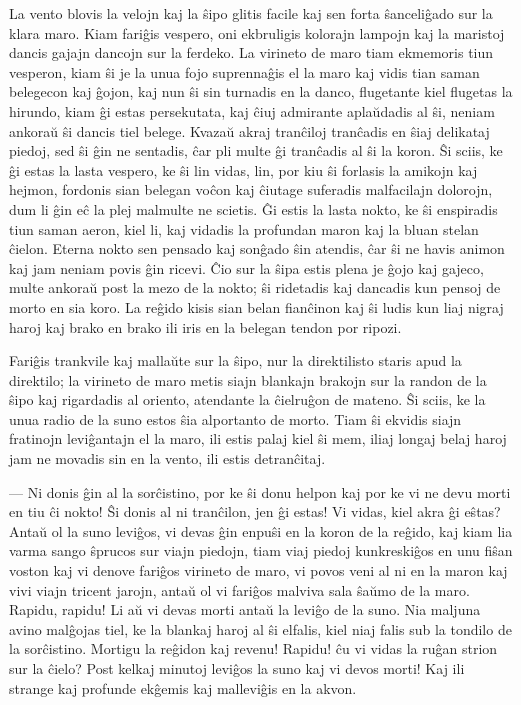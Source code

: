    La vento blovis la velojn kaj la \^sipo glitis facile kaj sen forta
\^sanceli\^gado sur la klara maro. Kiam fari\^gis vespero, oni
ekbruligis kolorajn lampojn kaj la maristoj dancis gajajn dancojn
sur la ferdeko. La virineto de maro tiam ekmemoris tiun vesperon,
kiam \^si je la unua fojo suprenna\^gis el la maro kaj vidis tian
saman belegecon kaj \^gojon, kaj nun \^si sin turnadis en la danco,
flugetante kiel flugetas la hirundo, kiam \^gi estas persekutata,
kaj \^ciuj admirante apla\u udadis al \^si, neniam ankora\u u \^si
dancis tiel belege. Kvaza\u u akraj tran\^ciloj tran\^cadis en
\^siaj delikataj piedoj, sed \^si \^gin ne sentadis, \^car pli multe
\^gi tran\^cadis al \^si la koron. \^Si sciis, ke \^gi estas la
lasta vespero, ke \^si lin vidas, lin, por kiu \^si forlasis la
amikojn kaj hejmon, fordonis sian belegan vo\^con kaj \^ciutage
suferadis malfacilajn dolorojn, dum li \^gin e\^c la plej malmulte
ne scietis. \^Gi estis la lasta nokto, ke \^si enspiradis tiun saman
aeron, kiel li, kaj vidadis la profundan maron kaj la bluan stelan
\^cielon. Eterna nokto sen pensado kaj son\^gado \^sin atendis,
\^car \^si ne havis animon kaj jam neniam povis \^gin ricevi. \^Cio
sur la \^sipa estis plena je \^gojo kaj gajeco, multe ankora\u u
post la mezo de la nokto; \^si ridetadis kaj dancadis kun pensoj de
morto en sia koro. La re\^gido kisis sian belan fian\^cinon kaj \^si
ludis kun liaj nigraj haroj kaj brako en brako ili iris en la
belegan tendon por ripozi.

   Fari\^gis trankvile kaj malla\u ute sur la \^sipo, nur la direktilisto
staris apud la direktilo; la virineto de maro metis siajn blankajn
brakojn sur la randon de la \^sipo kaj rigardadis al oriento,
atendante la \^cielru\^gon de mateno. \^Si sciis, ke la unua radio
de la suno estos \^sia alportanto de morto. Tiam \^si ekvidis siajn
fratinojn levi\^gantajn el la maro, ili estis palaj kiel \^si mem,
iliaj longaj belaj haroj jam ne movadis sin en la vento, ili estis
detran\^citaj.

 --- Ni donis \^gin al la sor\^cistino, por ke \^si donu helpon kaj por ke
vi ne devu morti en tiu \^ci nokto! \^Si donis al ni tran\^cilon,
jen \^gi estas! Vi vidas, kiel akra \^gi e\^stas? Anta\u u ol la
suno levi\^gos, vi devas \^gin enpu\^si en la koron de la re\^gido,
kaj kiam lia varma sango \^sprucos sur viajn piedojn, tiam viaj
piedoj kunkreski\^gos en unu fi\^san voston kaj vi denove fari\^gos
virineto de maro, vi povos veni al ni en la maron kaj vivi viajn
tricent jarojn, anta\u u ol vi fari\^gos malviva sala \^sa\u umo de
la maro. Rapidu, rapidu! Li a\u u vi devas morti anta\u u la
levi\^go de la suno. Nia maljuna avino mal\^gojas tiel, ke la
blankaj haroj al \^si elfalis, kiel niaj falis sub la tondilo de la
sor\^cistino. Mortigu la re\^gidon kaj revenu! Rapidu! \^cu vi vidas
la ru\^gan strion sur la \^cielo? Post kelkaj minutoj levi\^gos la
suno kaj vi devos morti! Kaj ili strange kaj profunde ek\^gemis kaj
mallevi\^gis en la akvon.

